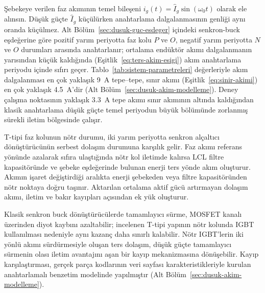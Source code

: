 Şebekeye verilen faz akımının temel bileşeni $i_g(t)=\hat I_g\sin(\omega_0t)$ olarak ele alınsın. Düşük güçte $\hat I_g$ küçülürken anahtarlama dalgalanmasının genliği aynı oranda küçülmez. Alt Bölüm~\ref{sec:dusuk-guc-esdeger} içindeki senkron-buck eşdeğerine göre pozitif yarım periyotta faz kolu $P$ ve $O$, negatif yarım periyotta $N$ ve $O$ durumları arasında anahtarlanır; ortalama endüktör akımı dalgalanmanın yarısından küçük kaldığında (Eşitlik~\eqref{eq:ters-akim-esigi}) akım anahtarlama periyodu içinde sıfırı geçer. Tablo~\ref{tab:sistem-parametreleri} değerleriyle akım dalgalanması en çok yaklaşık \SI{9}{\ampere} tepe--tepe, sınır akımı (Eşitlik~\eqref{eq:sinir-akimi}) en çok yaklaşık \SI{4.5}{\ampere}'dir (Alt Bölüm~\ref{sec:dusuk-akim-modelleme}). Deney çalışma noktasının yaklaşık \SI{3.3}{\ampere} tepe akımı sınır akımının altında kaldığından klasik anahtarlama düşük güçte temel periyodun büyük bölümünde zorlanmış sürekli iletim bölgesinde çalışır.

T-tipi faz kolunun nötr durumu, iki yarım periyotta senkron alçaltıcı dönüştürücünün serbest dolaşım durumuna karşılık gelir. Faz akımı referans yönünde azalarak sıfıra ulaştığında nötr kol iletimde kalırsa LCL filtre kapasitöründe ve şebeke eşdeğerinde bulunan enerji ters yönde akım oluşturur. Akımın işaret değiştirdiği aralıkta enerji şebekeden veya filtre kapasitöründen nötr noktaya doğru taşınır. Aktarılan ortalama aktif gücü artırmayan dolaşım akımı, iletim ve bakır kayıpları açısından ek yük oluşturur.

Klasik senkron buck dönüştürücülerde tamamlayıcı sürme, MOSFET kanalı üzerinden diyot kaybını azaltabilir; incelenen T-tipi yapının nötr kolunda IGBT kullanılması nedeniyle aynı kazanç daha sınırlı kalabilir. Nötr IGBT'lerin iki yönlü akımı sürdürmesiyle oluşan ters dolaşım, düşük güçte tamamlayıcı sürmenin olası iletim avantajını aşan bir kayıp mekanizmasına dönüşebilir. Kayıp karşılaştırması, gerçek parça kodlarının veri sayfası karakteristikleriyle kurulan anahtarlamalı benzetim modelinde yapılmıştır (Alt Bölüm~\ref{sec:dusuk-akim-modelleme}).

